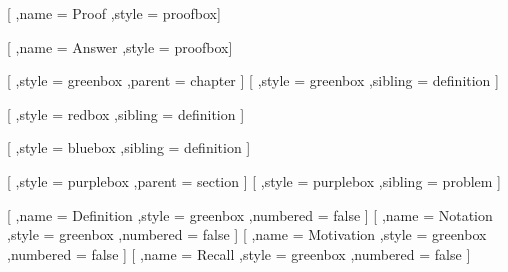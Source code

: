 [
    ,name = Proof
    ,style = proofbox]
\renewenvironment{proof}[1][\proofname]
{\vspace{-\vlengthBetweenColoredBoxes}\begin{proof*}}{\end{proof*}}

[
    ,name = Answer
    ,style = proofbox]
\newenvironment{answer}[1][\proofname]
{\vspace{-\vlengthBetweenColoredBoxes}\begin{answer*}}{\end{answer*}}

        [
            ,style = greenbox
            ,parent = chapter
        ]
        [
            ,style = greenbox
            ,sibling = definition
        ]

        [
            ,style = redbox
            ,sibling = definition
        ]

        [
            ,style = bluebox
            ,sibling = definition
        ]

        [
            ,style = purplebox
            ,parent = section
        ]
        [
            ,style = purplebox
            ,sibling = problem
        ]

        [
            ,name = Definition
            ,style = greenbox
            ,numbered = false
        ]
        [
            ,name = Notation
            ,style = greenbox
            ,numbered = false
        ]
        [
            ,name = Motivation
            ,style = greenbox
            ,numbered = false
        ]
        [
            ,name = Recall
            ,style = greenbox
            ,numbered = false
        ]

